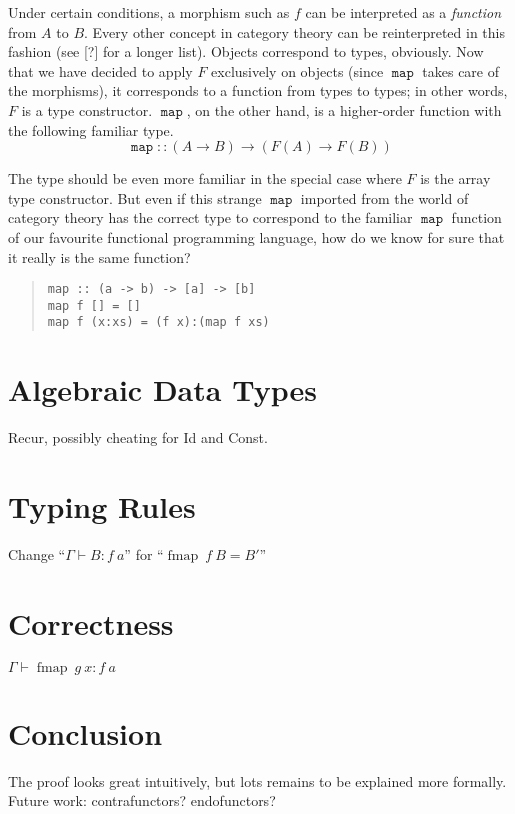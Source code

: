 \documentclass{article}
\newcommand{\entail}{\vdash}
\newcommand{\map}{\ensuremath{\mathop{\mathtt{map}}}}
\newcommand{\fmap}{\mathop{\mathrm{fmap}}}
\newenvironment{indented}%
{\vspace{-2.5\bigskipamount}\begin{quotation}\noindent}%
{\end{quotation}}
\begin{document}
\begin{multicols}{2}
Under certain conditions, a morphism such as $f$ can be interpreted as a \emph{function} from $A$ to $B$. Every other concept in category theory can be reinterpreted in this fashion (see [?] for a longer list). Objects correspond to types, obviously. Now that we have decided to apply $F$ exclusively on objects (since $\map$ takes care of the morphisms), it corresponds to a function from types to types; in other words, $F$ is a type constructor. $\map$, on the other hand, is a higher-order function with the following familiar type.
\begin{equation}\label{map}
\map :: (A \rightarrow B) \rightarrow (F(A) \rightarrow F(B))
\end{equation}

The type should be even more familiar in the special case where $F$ is the array type constructor. But even if this strange $\map$ imported from the world of category theory has the correct type to correspond to the familiar $\map$ function of our favourite functional programming language, how do we know for sure that it really is the same function?
\begin{indented}
\begin{verbatim}
map :: (a -> b) -> [a] -> [b]
map f [] = []
map f (x:xs) = (f x):(map f xs)
\end{verbatim}
\end{indented}

\section{Algebraic Data Types}\label{simple}
Recur, possibly cheating for Id and Const.

\section{Typing Rules}\label{complicated}
\vspace{-\parskip}\hspace*{\parindent}Change ``$\Gamma \entail B : f~a$'' for ``$\fmap~f~B = B'$''

\section{Correctness}\label{proof}
\vspace{-\parskip}\hspace*{\parindent}$\Gamma \entail \fmap~g~x : f~a$

\section{Conclusion}\label{conclusion}
\vspace{-\parskip}\hspace*{\parindent}The proof looks great intuitively, but lots remains to be explained more formally. Future work: contrafunctors? endofunctors?
\end{multicols}
\end{document}
